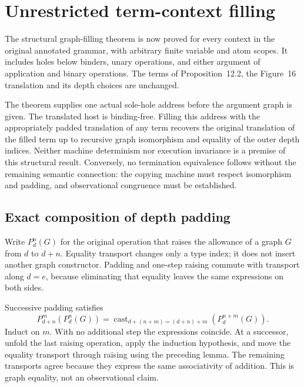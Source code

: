 \clearpage
\section{Unrestricted term-context filling}
\label{sec:copying-context-filling}
The structural graph-filling theorem is now proved for every context in the
original annotated grammar, with arbitrary finite variable and atom scopes.
It includes holes below binders, unary operations, and either argument of
application and binary operations. The terms of Proposition~12.2, the
Figure~16 translation and its depth choices are unchanged.

The theorem supplies one actual sole-hole address before the argument graph
is given. The translated host is binding-free. Filling this address with the
appropriately padded translation of any term recovers the original translation
of the filled term up to recursive graph isomorphism and equality of the outer
depth indices. Neither machine determinism nor execution invariance is a premise
of this structural result. Conversely, no termination equivalence follows
without the remaining semantic connection: the copying machine must respect
isomorphism and padding, and observational congruence must be established.

\subsection{Exact composition of depth padding}
Write $P_d^n(G)$ for the original operation that raises the allowance of a graph
$G$ from $d$ to $d+n$. Equality transport changes only a type index; it does
not insert another graph constructor. Padding and one-step raising commute
with transport along $d=e$, because eliminating that equality leaves the
same expressions on both sides.






Successive padding satisfies
\[
 P_{d+n}^{m}(P_d^n(G))
   =\operatorname{cast}_{d+(n+m)=(d+n)+m}(P_d^{n+m}(G)).
\]
Induct on $m$. With no additional step the expressions coincide. At a
successor, unfold the last raising operation, apply the induction hypothesis,
and move the equality transport through raising using the preceding lemma.
The remaining transports agree because they express the same associativity
of addition. This is graph equality, not an observational claim.

